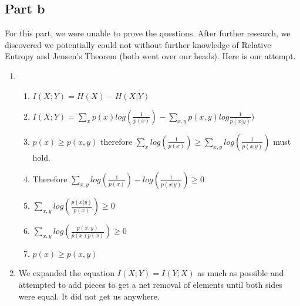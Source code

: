 \documentclass{article}
\begin{document}
\subsection{Part b}
For this part, we were unable to prove the questions.  After further research, we discovered we potentially could not without further knowledge of Relative Entropy and Jensen's Theorem (both went over our heads).  Here is our attempt.
\begin{enumerate}[label=\roman*. ]
\item
\begin{enumerate}[label=]
\item \(I(X;Y)=H(X)-H(X|Y)\)
\item \(I(X;Y)=\displaystyle\sum_{x}p(x)log(\frac{1}{p(x)}) - \displaystyle\sum_{x,y}p(x,y)log\frac{1}{p(x|y)})\)
\item \(p(x) \geq p(x,y)\) therefore \(\displaystyle\sum_{x}log(\frac{1}{p(x)}) \geq \displaystyle\sum_{x,y}log(\frac{1}{p(x|y)})\) must hold.
\item Therefore \(\displaystyle\sum_{x,y} log(\frac{1}{p(x)}) - log(\frac{1}{p(x|y)}) \geq 0\)
\item \(\displaystyle\sum_{x,y} log(\frac{p(x|y)}{p(x)}) \geq 0\)
\item \(\displaystyle\sum_{x,y} log(\frac{p(x,y)}{p(x)p(x)}) \geq 0\)
\item \(p(x) \geq p(x,y)\)
\end{enumerate}

\item We expanded the equation \(I(X;Y)=I(Y;X)\) as much as possible and attempted to add pieces to get a net removal of elements until both sides were equal.  It did not get us anywhere.
\end{enumerate}
\end{document}
